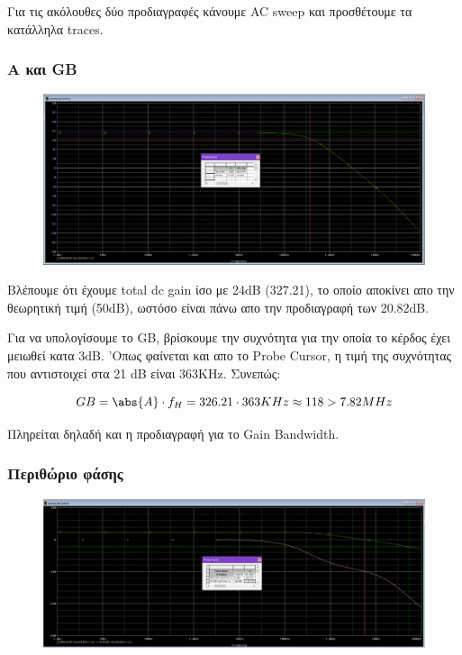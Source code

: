 \documentclass[12pt, a4paper]{article}
\begin{document}
Για τις ακόλουθες δύο προδιαγραφές κάνουμε AC sweep και προσθέτουμε τα κατάλληλα traces.

\subsubsection{A και GB}

\begin{figure}[h!]
	\centering
	\includegraphics[width = \textwidth, height = .25\textheight, keepaspectratio]{assets/gain_GB.png}
\end{figure}

Βλέπουμε ότι έχουμε total dc gain ίσο με 24dB (327.21), το οποίο αποκίνει απο την θεωρητική τιμή (50dB), ωστόσο είναι πάνω απο την προδιαγραφή των 20.82dB.

Για να υπολογίσουμε το GB, βρίσκουμε την συχνότητα για την οποία το κέρδος έχει μειωθεί κατα 3dB. 'Οπως φαίνεται και απο το Probe Cursor, η τιμή της συχνότητας που αντιστοιχεί στα 21 dB είναι 363ΚHz. Συνεπώς:

\[  GB = \abs{A} \cdot f_H = 326.21 \cdot 363KHz \approx 118 > 7.82 MHz \]

Πληρείται δηλαδή και η προδιαγραφή για το Gain Bandwidth.

\subsubsection{Περιθώριο φάσης}

\begin{figure}[h!]
	\centering
	\includegraphics[width = \textwidth, height = .25\textheight, keepaspectratio]{assets/phase_margin.png}
\end{figure}
\end{document}
